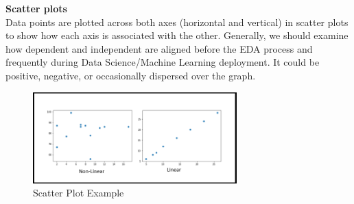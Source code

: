\textbf{Scatter plots} \\
Data points are plotted across both axes (horizontal and vertical) in scatter plots to show how each axis is associated with the other. Generally, we should examine how dependent and independent are aligned before the EDA process and frequently during Data Science/Machine Learning deployment. It could be positive, negative, or occasionally dispersed over the graph.

\begin{figure}[H]
    \centering
    \includegraphics[width=0.7\textwidth]{Images/53461Scatter plots.png}
    \caption{Scatter Plot Example}
    \label{fig1}
\end{figure}
